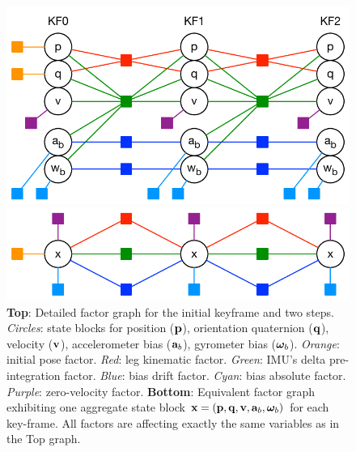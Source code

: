 \begin{figure}[tb]
\begin{center}
\includegraphics[scale=0.65]{figures/graph_exploded}
\par\vspace{4mm}
\includegraphics[scale=0.65]{figures/graph_essential}
\caption{
{\bf Top}: Detailed factor graph for the initial keyframe and two steps. \emph{Circles}: state blocks for position (${\bf p}$), orientation quaternion (${\bf q}$), velocity (${\bf v}$), accelerometer bias (${\bf a}_b$), gyrometer bias (${{\bm \omega}}_b$). \emph{Orange}: initial pose factor. \emph{Red}: leg kinematic factor. \emph{Green}: IMU's delta pre-integration factor. 
\emph{Blue}: bias drift factor. \emph{Cyan}: bias absolute factor. \emph{Purple}: zero-velocity factor. 
{\bf Bottom}: Equivalent factor graph exhibiting one aggregate state block ${\bf x}=({\bf p},{\bf q},{\bf v},{\bf a}_b,{{\bm \omega}}_b)$ for each key-frame. All factors are affecting exactly the same variables as in the Top graph.
}
\label{fig:factor_graph}
\end{center}
\end{figure}


